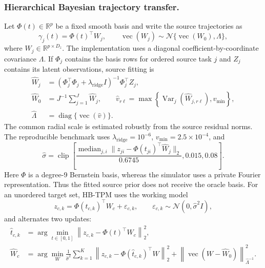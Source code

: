 \documentclass{article}
\begin{document}
\subsubsection{Hierarchical Bayesian trajectory transfer.}
Let $\Phi(t)\in\mathbb{R}^{p}$ be a fixed smooth basis and write the source trajectories as
\begin{equation}
	\gamma_j(t)=\Phi(t)^\top W_j,
	\qquad
	\operatorname{vec}(W_j)
	\sim
	\mathcal{N}\{\operatorname{vec}(W_0),\Lambda\},
	\label{eq:hb_tpm_source}
\end{equation}
where $W_j\in\mathbb{R}^{p\times D_z}$. The implementation uses a diagonal coefficient-by-coordinate covariance $\Lambda$. If $\Phi_j$ contains the basis rows for ordered source task $j$ and $Z_j$ contains its latent observations, source fitting is
\begin{align}
	\widehat W_j
	&=(\Phi_j^\top\Phi_j+\lambda_{\mathrm{ridge}}I)^{-1}\Phi_j^\top Z_j,\nonumber\\
	\widehat W_0
	&=J^{-1}\sum_{j=1}^{J}\widehat W_j,\qquad
	\widehat v_{r\ell}
	=\max\!\left\{\operatorname{Var}_j(\widehat W_{j,r\ell}),v_{\min}\right\},\nonumber\\
	\widehat\Lambda
	&=\operatorname{diag}\{\operatorname{vec}(\widehat v)\}.
	\label{eq:hb_tpm_prior_fit}
\end{align}
The common radial scale is estimated robustly from the source residual norms. The reproducible benchmark uses $\lambda_{\mathrm{ridge}}=10^{-6}$, $v_{\min}=2.5\times10^{-4}$, and
\[
	\widehat\sigma
	=
	\operatorname{clip}\!\left[
	\frac{\operatorname{median}_{j,i}
	\lVert z_{ji}-\Phi(t_{ji})^\top\widehat W_j\rVert_2}{0.6745},
	0.015,0.08
	\right].
\]
Here $\Phi$ is a degree-9 Bernstein basis, whereas the simulator uses a private Fourier representation. Thus the fitted source prior does not receive the oracle basis. For an unordered target set, HB-TPM uses the working model
\[
	z_{c,k}=\Phi(t_{c,k})^\top W_c+\varepsilon_{c,k},
	\qquad
	\varepsilon_{c,k}\sim\mathcal{N}(0,\widehat\sigma^2 I),
\]
and alternates two updates:
\begin{align}
	\widehat t_{c,k}
	&=\arg\min_{t\in[0,1]}
	\left\lVert z_{c,k}-\Phi(t)^\top W_c\right\rVert_2^2,
	\label{eq:hb_tpm_index}\\
	\widehat W_c
	&=\arg\min_W
	\frac{1}{\widehat\sigma^2}\sum_{k=1}^{K}
	\left\lVert z_{c,k}-\Phi(\widehat t_{c,k})^\top W\right\rVert_2^2
	+\left\lVert\operatorname{vec}(W-\widehat W_0)\right\rVert_{\widehat\Lambda^{-1}}^2.
	\label{eq:hb_tpm_map}
\end{align}
\end{document}
